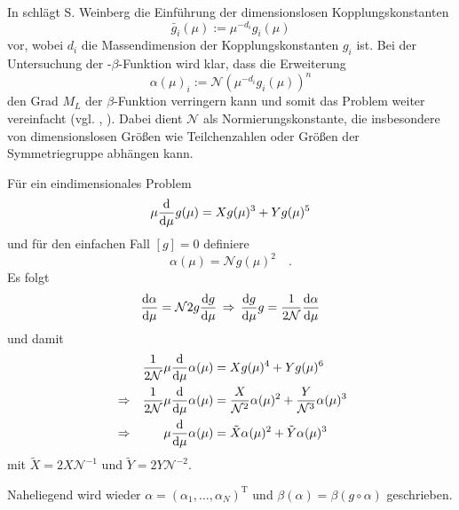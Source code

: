       In \cite{GR_Weinberg} schlägt S. Weinberg die Einführung der dimensionslosen 
      Kopplungskonstanten
      \begin{equation}
       \bar{g}_i(\mu):= \mu^{-d_i} g_i(\mu)
      \end{equation}
      vor, wobei $d_i$ die Massendimension der Kopplungskonstanten $g_i$ ist. Bei der 
      Untersuchung der \QCDxdQCD-$\beta$-Funktion wird klar, dass die Erweiterung 
      \begin{equation}
       \alpha(\mu)_i:= \mathcal{N} \left(\mu^{-d_i} g_i(\mu)\right)^n
      \end{equation}
      den Grad $M_L$ der $\beta$-Funktion verringern kann und somit das Problem weiter 
      vereinfacht (vgl. \cite{Scale_of_dark_QCD}, \cite{Asymptotic_safety_guaranteed}). Dabei 
      dient $\mathcal{N}$ als Normierungskonstante, die insbesondere von dimensionslosen 
      Größen wie Teilchenzahlen oder Größen der Symmetriegruppe abhängen kann.
      \begin{beispiel}
	  Für ein eindimensionales Problem
	  \begin{equation}
	  \mu \frac{\text{d}}{\text{d} \mu} g(\mu) = X g(\mu)^3 + Y g(\mu)^5
	  \end{equation}
	  und für den einfachen Fall $[g]=0$ definiere 
	  \begin{equation}
	  \alpha(\mu) =\mathcal{N} g(\mu)^2 \quad .
	  \end{equation}
	  Es folgt
	\begin{equation}
	\frac{\text{d} \alpha}{\text{d} \mu}=\mathcal{N} 2 g \frac{\text{d} g}{\text{d} \mu} 
	\,\Rightarrow \, \frac{\text{d} g}{\text{d} \mu} g=\frac{1}{2\mathcal{N}} 
	\frac{\text{d} \alpha}{\text{d} \mu}
	\end{equation}
	und damit 
	 \begin{align}
	 &&\frac{1}{2\mathcal{N}} \mu \frac{\text{d}}{\text{d} \mu} \alpha(\mu) &= 
	 X g(\mu)^4 +Yg(\mu)^6 \\
	 &\Rightarrow&\frac{1}{2\mathcal{N}} \mu \frac{\text{d}}{\text{d} \mu} \alpha(\mu) &= 
	 \frac{X}{\mathcal{N}^2} \alpha(\mu)^2 + \frac{Y}{\mathcal{N}^3} \alpha(\mu)^3\\
	 &\Rightarrow& \mu \frac{\text{d}}{\text{d} \mu} \alpha(\mu) &=\tilde{X}\alpha(\mu)^2+\tilde{Y}
	 \alpha(\mu)^3 
	\end{align}
	mit $\tilde{X}=2X\mathcal{N}^{-1}$ und $\tilde{Y}=2Y\mathcal{N}^{-2}$.
    \end{beispiel}
    Naheliegend wird wieder $\alpha=(\alpha_1,\ldots,\alpha_N)^\text{T}$ und 
    $\beta(\alpha)=\beta(g\circ\alpha)$ geschrieben.
    
